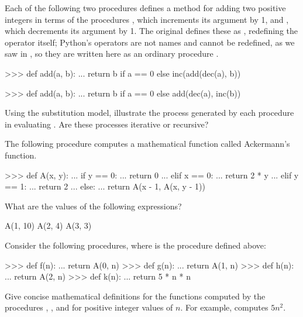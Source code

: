 \begin{exerciseGroup}
\label{Exercise 1.9}
 Each of the following two
procedures defines a method for adding two positive integers in terms of the
procedures , which increments its argument by 1, and ,
which decrements its argument by 1.  The original defines these as \code{+},
redefining the operator itself; Python's operators are not names and cannot be
redefined, as we saw in , so they are written here as an
ordinary procedure .

\begin{codeBlock}
>>> def add(a, b):
...     return b if a == 0 else inc(add(dec(a), b))

>>> def add(a, b):
...     return b if a == 0 else add(dec(a), inc(b))
\end{codeBlock}

Using the substitution model, illustrate the process generated by each
procedure in evaluating .  Are these processes iterative or
recursive?

\label{Exercise 1.10}
 The following procedure computes
a mathematical function called Ackermann's function.

\begin{codeBlock}
>>> def A(x, y):
...     if y == 0:
...         return 0
...     elif x == 0:
...         return 2 * y
...     elif y == 1:
...         return 2
...     else:
...         return A(x - 1, A(x, y - 1))
\end{codeBlock}

What are the values of the following expressions?

\begin{codeBlock}
A(1, 10)
A(2, 4)
A(3, 3)
\end{codeBlock}

Consider the following procedures, where  is the procedure
defined above:

\begin{codeBlock}
>>> def f(n):
...     return A(0, n)
>>> def g(n):
...     return A(1, n)
>>> def h(n):
...     return A(2, n)
>>> def k(n):
...     return 5 * n * n
\end{codeBlock}

Give concise mathematical definitions for the functions computed by the
procedures , , and  for positive integer values of
\( n \).  For example,  computes \( 5n^2 \).
\end{exerciseGroup}

